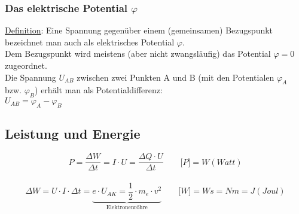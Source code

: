 \subsubsection{Das elektrische Potential $ \varphi $}
\underline{Definition}: Eine Spannung gegenüber einem (gemeinsamen) Bezugspunkt bezeichnet man auch als elektrisches Potential $\varphi$.\\
Dem Bezugspunkt wird meistens (aber nicht zwangsläufig) das Potential $\varphi = 0$ zugeordnet.\\
 Die Spannung $U_{AB}$ zwischen zwei Punkten A und B (mit den Potentialen $\varphi _{A} $ bzw. $\varphi _{B}$) erhält man als Potentialdifferenz:\\ $ U_{AB}= \varphi _{A} - \varphi _{B}$\\

\subsection{Leistung und Energie}
	$$ P = \frac{\Delta W}{\Delta t}= I \cdot U = \frac{\Delta Q \cdot U}{\Delta t} \qquad \lbrack P \rbrack = W (Watt)$$\\
	$$ \Delta W = U \cdot I \cdot \Delta t = \underbrace {e \cdot U_{AK} = \frac{1}{2} \cdot m_{e} \cdot v^2}_\text{Elektronenröhre} \qquad \lbrack W \rbrack = Ws = Nm = J (Joul)$$
	